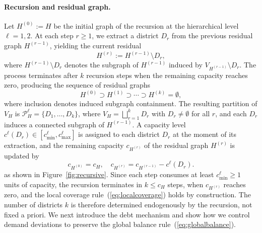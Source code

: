 \documentclass[preprint,12pt,authoryear]{elsarticle}
\theoremstyle{definition}
\begin{document}
\paragraph{Recursion and residual graph.} Let $H^{(0)} := H$ be the initial graph of the recursion at the hierarchical level $\ell=1,2$. At each step $r \geq 1$, we extract a district $D_r$ from the previous residual graph $H^{(r-1)}$, yielding the current residual
%
\[
    H^{(r)} := H^{(r-1)} \setminus D_{r},
\]
%
where $H^{(r-1)} \setminus D_r$ denotes the subgraph of $H^{(r-1)}$ induced by $V_{H^{(r-1)}} \setminus D_r$. The process terminates after $k$ recursion steps when the remaining capacity reaches zero, producing the sequence of residual graphs
%
\[
    H^{(0)} \supset H^{(1)} \supset \cdots \supset H^{(k)}  = \emptyset,
\]
%
where inclusion denotes induced subgraph containment. The resulting partition of $V_H$ is $\mathcal{P}^{\ell}_H = \{D_1, \ldots, D_k\}$, where $V_H = \bigsqcup_{r=1}^{k} D_r$ with $D_r \neq \emptyset$ for all $r$, and each $D_r$ induces a connected subgraph of $H^{(r-1)}$. A capacity level $c^{\ell}(D_r) \in [c_{\min}^{\ell}, c_{\max}^{\ell}]$ is assigned to each district $D_r$ at the moment of its extraction, and the remaining capacity $c_{H^{(r)}}$ of the residual graph $H^{(r)}$ is updated by 
%
\begin{equation}\label{eq:capacityupdate}
    c_{H^{(0)}} = c_H, \quad c_{H^{(r)}} = c_{H^{(r-1)}} - c^\ell(D_r).
\end{equation}
%
as shown in Figure~\ref{fig:recursive}. Since each step consumes at least $c_{\min}^\ell \geq 1$ units of capacity, the recursion terminates in $k \leq c_H$ steps, when $c_{H^{(r)}}$ reaches zero, and the local coverage rule~(\ref{eq:localcoverage}) holds by construction. The number of districts $k$ is therefore determined endogenously by the recursion, not fixed a priori. We next introduce the debt mechanism and show how we control demand deviations to preserve the global balance rule~(\ref{eq:globalbalance}).



\end{document}
